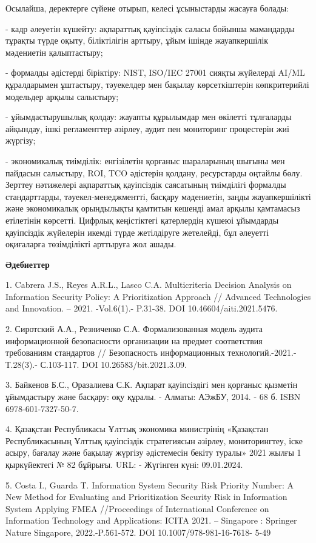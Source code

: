 Осылайша, деректерге сүйене отырып, келесі ұсыныстарды жасауға болады:


- кадр әлеуетін күшейту: ақпараттық қауіпсіздік саласы бойынша
мамандарды тұрақты түрде оқыту, біліктілігін арттыру, ұйым ішінде
жауапкершілік мәдениетін қалыптастыру;

- формалды әдістерді біріктіру: NIST, ISO/IEC 27001 сияқты жүйелерді
AI/ML құралдарымен ұштастыру, тәуекелдер мен бақылау көрсеткіштерін
көпкритерийлі модельдер арқылы салыстыру;

- ұйымдастырушылық қолдау: жауапты құрылымдар мен өкілетті тұлғаларды
айқындау, ішкі регламенттер әзірлеу, аудит пен мониторинг процестерін
жиі жүргізу;

- экономикалық тиімділік: енгізілетін қорғаныс шараларының шығыны мен
пайдасын салыстыру, ROI, TCO әдістерін қолдану, ресурстарды оңтайлы
бөлу.
Зерттеу нәтижелері ақпараттық қауіпсіздік саясатының тиімділігі формалды
стандарттарды, тәуекел-менеджментті, басқару мәдениетін, заңды
жауапкершілікті және экономикалық орындылықты қамтитын кешенді амал
арқылы қамтамасыз етілетінін көрсетті. Цифрлық кеңістіктегі қатерлердің
күшеюі ұйымдарды қауіпсіздік жүйелерін икемді түрде жетілдіруге
жетелейді, бұл әлеуетті оқиғаларға төзімділікті арттыруға жол ашады.

{\bfseries Әдебиеттер}

1. Cabrera J.S., Reyes A.R.L., Lasco C.A. Multicriteria Decision Analysis
on Information Security Policy: A Prioritization Approach // Advanced
Technologies and Innovation. -- 2021. -Vol.6(1).- P.31-38. DOI
10.46604/aiti.2021.5476.

2. Сиротский А.А., Резниченко С.А. Формализованная модель аудита
информационной безопасности организации на предмет соответствия
требованиям стандартов // Безопасность информационных
технологий.-2021.-Т.28(3).- С.103-117. DOI 10.26583/bit.2021.3.09.

3. Байкенов Б.С., Оразалиева С.К. Ақпарат қауіпсіздігі мен қорғаныс
қызметін ұйымдастыру және басқару: оқу құралы. - Алматы: АЭжБУ, 2014. -
68 б. ISBN 6978-601-7327-50-7.

4. Қазақстан Республикасы Ұлттық экономика министрінің «Қазақстан
Республикасының Ұлттық қауіпсіздік стратегиясын әзірлеу, мониторингтеу,
іске асыру, бағалау және бақылау жүргізу әдістемесін бекіту туралы» 2021
жылғы 1 қыркүйектегі № 82 бұйрығы. URL:
\href{https://adilet.zan.kz/kaz/docs/V2100024227}{}
- Жүгінген күні: 09.01.2024.

5. Costa I., Guarda T. Information System Security Risk Priority Number:
A New Method for Evaluating and Prioritization Security Risk in
Information System Applying FMEA //Proceedings of International
Conference on Information Technology and Applications: ICITA 2021. --
Singapore : Springer Nature Singapore, 2022.-P.561-572. DOI
10.1007/978-981-16-7618- 5-49

